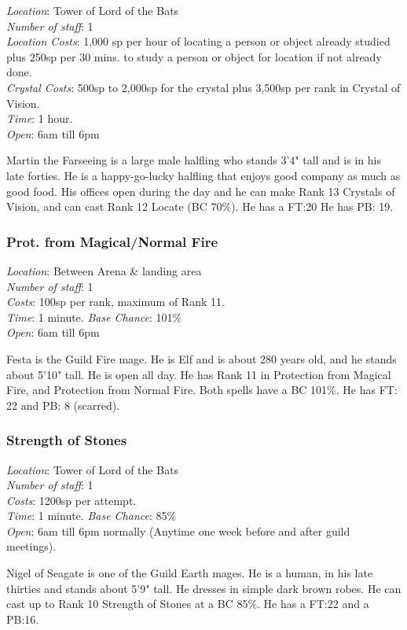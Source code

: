 \documentclass[twoside,a4paper]{article}
\begin{document}
\begin{multicols}{2}
\begin{flushleft}
\emph{Location}: Tower of Lord of the Bats \\
\emph{Number of staff}: 1 \\
\emph{Location Costs}: 1,000 sp per hour of locating
a person or object already studied plus 250sp
per 30 mins. to study a person or object for
location if not already done. \\
\emph{Crystal Costs}: 500sp to 2,000sp for the
crystal plus 3,500sp per rank in Crystal of Vision. \\
\emph{Time}: 1 hour. \\
\emph{Open}: 6am till 6pm \\
\end{flushleft}
Martin the Farseeing is a large male halfling who stands 3'4" tall and
is in his late forties. He is a happy-go-lucky halfling that enjoys
good company as much as good food. His offices open during the day and
he can make Rank 13 Crystals of Vision, and can cast Rank 12
Locate (BC 70\%). He has a FT:20 He has PB: 19.

\subsubsection{Prot. from Magical/Normal Fire}

\begin{flushleft}
\emph{Location}: Between Arena \& landing area  \\
\emph{Number of staff}: 1 \\
\emph{Costs}: 100sp per rank, maximum of Rank 11. \\
\emph{Time}: 1 minute.
\emph{Base Chance}: 101\% \\
\emph{Open}: 6am till 6pm \\
\end{flushleft}
Festa is the Guild Fire mage. He is Elf and is about 280 years old,
and he stands about 5'10" tall. He is open all day. He has Rank 11 in
Protection from Magical Fire, and Protection from Normal Fire. Both
spells have a BC 101\%. He has FT: 22 and PB: 8 (scarred).

\subsubsection{Strength of Stones}

\begin{flushleft}
\emph{Location}: Tower of Lord of the Bats \\
\emph{Number of staff}: 1 \\
\emph{Costs}: 1200sp per attempt. \\
\emph{Time}: 1 minute.
\emph{Base Chance}: 85\% \\
\emph{Open}: 6am till 6pm normally (Anytime one week before and after guild meetings). \\
\end{flushleft}
Nigel of Seagate is one of the Guild Earth mages. He is a human, in
his late thirties and stands about 5'9" tall. He dresses in simple
dark brown robes. He can cast up to Rank 10 Strength of Stones at a BC
85\%. He has a FT:22 and a PB:16.


\end{multicols}
\end{document}
